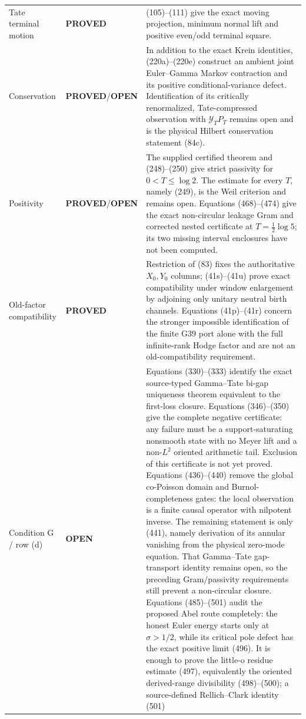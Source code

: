 \documentclass[11pt]{article}
\newcommand{\PROVED}{\textcolor{green!45!black}{\textbf{PROVED}}}
\newcommand{\OPEN}{\textcolor{red!70!black}{\textbf{OPEN}}}
\begin{document}
\begin{center}
\begin{tabular}{p{}p{}p{}}
Tate terminal motion & \PROVED & (105)--(111) give the exact moving
projection, minimum normal lift and positive even/odd terminal square. \\
Conservation & \PROVED/\OPEN & In addition to the exact Krein identities,
(220a)--(220e) construct an ambient joint Euler--Gamma Markov contraction and
its positive conditional-variance defect.  Identification of its critically
renormalized, Tate-compressed observation with $\mathcal Y_TP_T$ remains
open and is the physical Hilbert conservation statement (84c). \\
Positivity & \PROVED/\OPEN & The supplied certified theorem and (248)--(250)
give strict passivity for $0<T\le\log2$.  The estimate for every $T$, namely
(249), is the Weil criterion and remains open.  Equations (468)--(474)
give the exact non-circular leakage Gram and corrected nested certificate at
$T=\frac12\log5$; its two missing interval enclosures have not been computed.
\\
Old-factor compatibility & \PROVED & Restriction of (83) fixes the
authoritative $X_0,Y_0$ columns; (41s)--(41u) prove exact compatibility under
window enlargement by adjoining only unitary neutral birth channels.
Equations (41p)--(41r) concern the stronger impossible identification of the
finite G39 port alone with the full infinite-rank Hodge factor and are not an
old-compatibility requirement. \\
Condition G / row (d) & \OPEN & Equations (330)--(333) identify the exact
source-typed Gamma--Tate bi-gap uniqueness theorem equivalent to the
first-loss closure.  Equations (346)--(350) give the complete negative
certificate: any failure must be a support-saturating nonsmooth state with
no Meyer lift and a non-$L^2$ oriented arithmetic tail.  Exclusion of this
certificate is not yet proved.  Equations (436)--(440) remove the global
co-Poisson domain and Burnol-completeness gates: the local observation is a
finite causal operator with nilpotent inverse.  The remaining statement is
only (441), namely derivation of its annular vanishing from the physical
zero-mode equation.  That Gamma--Tate gap-transport identity remains open,
so the preceding Gram/passivity requirements still prevent a non-circular
closure.  Equations (485)--(501) audit the proposed Abel route completely:
the honest Euler energy starts only at $\sigma>1/2$, while its critical pole
defect has the exact positive limit (496).  It is enough to prove the
      little-o residue estimate (497), equivalently the oriented derived-range
      divisibility (498)--(500); a source-defined Rellich--Clark identity (501)

\end{tabular}
\end{center}
\end{document}
